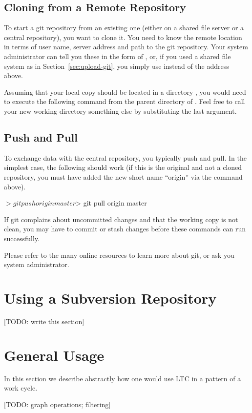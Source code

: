 \subsection{Cloning from a Remote Repository}

To start a git repository from an existing one (either on a shared file server or a central repository), you want to clone it.  You need to know the remote location in terms of user name, server address and path to the git repository.  Your system administrator can tell you these in the form of , or, if you used a shared file system as in Section~\ref{sec:upload-git}, you simply use  instead of the address above. 

Assuming that your local copy should be located in a directory , you would need to execute the following command from the parent directory of .  Feel free to call your new working directory something else by substituting the last argument.

\subsection{Push and Pull}

To exchange data with the central repository, you typically push and pull.  In the simplest case, the following should work (if this is the original and not a cloned repository, you must have added the new short name ``origin'' via the  command above).
\begin{CodeVerbatim}
$> git push origin master
$> git pull origin master
\end{CodeVerbatim}

If git complains about uncommitted changes and that the working copy is not clean, you may have to commit or stash changes before these commands can run successfully.

Please refer to the many online resources to learn more about git, or ask you system administrator.

\section{Using a Subversion Repository} \label{sec:svn-use}

[TODO: write this section]

\section{General Usage} \label{sec:general-use}

In this section we describe abstractly how one would use LTC in a pattern of a work cycle. %

[TODO: graph operations; filtering]



